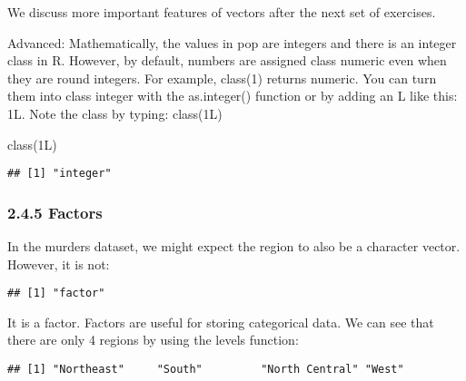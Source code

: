 \documentclass[
]{article}
\newenvironment{Shaded}{\begin{snugshade}}{\end{snugshade}}
\newcommand{\FunctionTok}[1]{\textcolor[rgb]{0.00,0.00,0.00}{#1}}
\newcommand{\NormalTok}[1]{#1}
\newcommand{\SpecialCharTok}[1]{\textcolor[rgb]{0.00,0.00,0.00}{#1}}
\begin{document}
We discuss more important features of vectors after the next set of
exercises.

Advanced: Mathematically, the values in pop are integers and there is an
integer class in R. However, by default, numbers are assigned class
numeric even when they are round integers. For example, class(1) returns
numeric. You can turn them into class integer with the as.integer()
function or by adding an L like this: 1L. Note the class by typing:
class(1L)

\begin{Shaded}
\begin{Highlighting}[]
\FunctionTok{class}\NormalTok{(1L)}
\end{Highlighting}
\end{Shaded}

\begin{verbatim}
## [1] "integer"
\end{verbatim}

\hypertarget{factors}{%
\subsubsection{2.4.5 Factors}\label{factors}}

In the murders dataset, we might expect the region to also be a
character vector. However, it is not:

\begin{Shaded}
\end{Shaded}

\begin{verbatim}
## [1] "factor"
\end{verbatim}

It is a factor. Factors are useful for storing categorical data. We can
see that there are only 4 regions by using the levels function:

\begin{Shaded}
\end{Shaded}

\begin{verbatim}
## [1] "Northeast"     "South"         "North Central" "West"
\end{verbatim}
\end{document}
